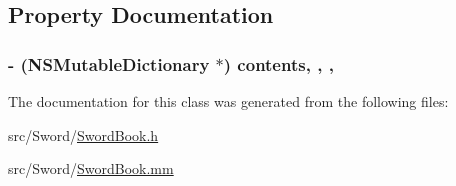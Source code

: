 \subsection{Property Documentation}
\hypertarget{interface_sword_book_a9cefdcab320999fc518fbccc3fd0fcdd}{
\subsubsection[{contents}]{\setlength{\rightskip}{0pt plus 5cm}-\/ (N\-S\-Mutable\-Dictionary $\ast$) contents\hspace{0.3cm}{\ttfamily [read]}, {\ttfamily [write]}, {\ttfamily [atomic]}, {\ttfamily [retain]}}}\label{interface_sword_book_a9cefdcab320999fc518fbccc3fd0fcdd}


The documentation for this class was generated from the following files\-:\begin{DoxyCompactItemize}
\item 
src/\-Sword/\hyperlink{_sword_book_8h}{Sword\-Book.\-h}\item 
src/\-Sword/\hyperlink{_sword_book_8mm}{Sword\-Book.\-mm}\end{DoxyCompactItemize}
